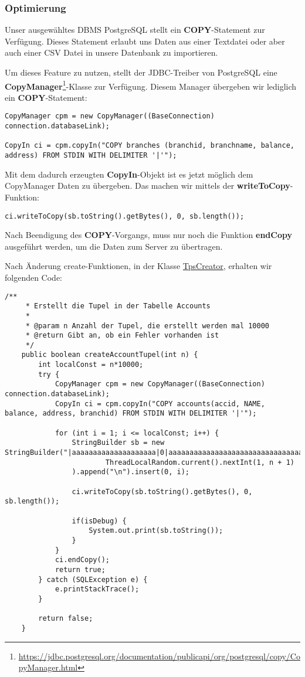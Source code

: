 \subsubsection*{Optimierung}
Unser ausgewähltes DBMS PostgreSQL stellt ein \textbf{COPY}-Statement zur
Verfügung. Dieses Statement erlaubt uns Daten aus einer Textdatei oder aber auch
einer CSV Datei in unsere Datenbank zu importieren. 

Um dieses Feature zu nutzen, stellt der JDBC-Treiber von PostgreSQL eine
\textbf{CopyManager}\footnote{\url{https://jdbc.postgresql.org/documentation/publicapi/org/postgresql/copy/CopyManager.html}}-Klasse
zur Verfügung. Diesem Manager übergeben wir lediglich ein
\textbf{COPY}-Statement:

\begin{lstlisting}[caption={Initialisierung des CopyManagers},numbers=none]
CopyManager cpm = new CopyManager((BaseConnection) connection.databaseLink);

CopyIn ci = cpm.copyIn("COPY branches (branchid, branchname, balance, address) FROM STDIN WITH DELIMITER '|'");
\end{lstlisting}

Mit dem dadurch erzeugten \textbf{CopyIn}-Objekt ist es jetzt möglich dem CopyManager Daten zu
übergeben.
Das machen wir mittels der \textbf{writeToCopy}-Funktion:

\begin{lstlisting}[caption={WriteToCopy-Funktion},numbers=none]
ci.writeToCopy(sb.toString().getBytes(), 0, sb.length());
\end{lstlisting}

Nach Beendigung des \textbf{COPY}-Vorgangs, muss nur noch die Funktion
\textbf{endCopy} ausgeführt werden, um die Daten zum Server zu übertragen.

Nach Änderung create-Funktionen, in der Klasse
\hyperref[lst:tpsv2]{TpsCreator}, erhalten wir folgenden Code:

\begin{lstlisting}[caption={createAccountTupel mit CopyManager}]
	/**
	 * Erstellt die Tupel in der Tabelle Accounts
	 * 
	 * @param n Anzahl der Tupel, die erstellt werden mal 10000
	 * @return Gibt an, ob ein Fehler vorhanden ist
	 */
	public boolean createAccountTupel(int n) {
		int localConst = n*10000;
		try {
			CopyManager cpm = new CopyManager((BaseConnection) connection.databaseLink);
			CopyIn ci = cpm.copyIn("COPY accounts(accid, NAME, balance, address, branchid) FROM STDIN WITH DELIMITER '|'");
			
			for (int i = 1; i <= localConst; i++) {
				StringBuilder sb = new StringBuilder("|aaaaaaaaaaaaaaaaaaaa|0|aaaaaaaaaaaaaaaaaaaaaaaaaaaaaaaaaaaaaaaaaaaaaaaaaaaaaaaaaaaaaaaaaaaa|").append(
						ThreadLocalRandom.current().nextInt(1, n + 1)
				).append("\n").insert(0, i);
				
				ci.writeToCopy(sb.toString().getBytes(), 0, sb.length());
				
				if(isDebug) {
					System.out.print(sb.toString());
				}
			}
	        ci.endCopy();			
			return true;
		} catch (SQLException e) {
			e.printStackTrace();
		}
		
		return false;
	}
\end{lstlisting}

